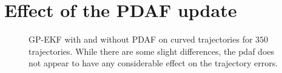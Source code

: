 \section{Effect of the PDAF update}
\begin{figure}[h]
    \centering
    \caption{GP-EKF with and without PDAF on curved trajectories for $350$ trajectories. While there are some slight differences, the \acrshort{pdaf} does not appear to have any considerable effect on the trajectory errors.}
    \label{fig:stats_curved_gp_ekf_with_or_without_pdaf}
\end{figure}

